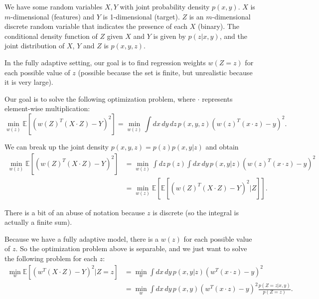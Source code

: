 \documentclass{article}
\begin{document}
We have some random variables $X, Y$ with joint probability density $p(x,y)$. $X$ is $m$-dimensional (features) and $Y$ is 1-dimensional (target). $Z$ is an $m$-dimensional discrete random variable that indicates the presence of each $X$ (binary). The conditional density function of $Z$ given $X$ and $Y$ is given by $p(z|x,y)$, and the joint distribution of $X$, $Y$ and $Z$ is $p(x, y, z)$.

In the fully adaptive setting, our goal is to find regression weights $w(Z=z)$ for each possible value of $z$ (possible because the set is finite, but unrealistic because it is very large).

Our goal is to solve the following optimization problem, where $\cdot$ represents element-wise multiplication:
\[
\min_{w(z)} \mathbb{E}\left[(w(Z)^T(X\cdot Z)-Y)^2\right]=\min_{w(z)}\int dx\,dy\,dz\,p(x,y,z) (w(z)^T(x\cdot z)-y)^2.
\]

We can break up the joint density $p(x, y, z)=p(z) p(x, y | z)$ and obtain
\begin{align*}
\min_{w(z)} \mathbb{E}\left[(w(Z)^T(X\cdot Z)-Y)^2\right]&=\min_{w(z)} \int dz\,p(z)\int dx\,dy\,p(x,y|z) (w(z)^T(x\cdot z)-y)^2\\
&=\min_{w(z)}\mathbb{E}\left[\mathbb{E}\left[(w(Z)^T(X\cdot Z)-Y)^2|Z\right]\right].
\end{align*}

There is a bit of an abuse of notation because $z$ is discrete (so the integral is actually a finite sum).

Because we have a fully adaptive model, there is a $w(z)$ for each possible value of $z$. So the optimization problem above is separable, and we just want to solve the following problem for each $z$:
\begin{align*}
\min_w \mathbb{E}\left[(w^T(X\cdot Z)-Y)^2|Z=z\right]&=\min_w\int dx\,dy\,p(x, y|z) (w^T(x\cdot z)-y)^2\\
&=\min_w \int dx\,dy\, p(x, y) (w^T(x\cdot z)-y)^2 \frac{p(Z=z|x,y)}{p(Z=z)}.
\end{align*}
\end{document}
